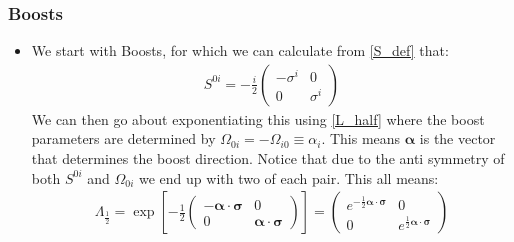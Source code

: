 \documentclass[11pt]{article}
\numberwithin{equation}{section}
\begin{document}
  \subsubsection{Boosts}
  \begin{itemize}
     \item We start with Boosts, for which we can calculate from \ref{S_def} that:
     \begin{align}
     \label{S_ij}
       S^{0i} = -\frac{i}{2}\begin{pmatrix}
        -\sigma^{i} & 0 \\
        0 & \sigma^{i} 
       \end{pmatrix}
     \end{align}
     We can then go about exponentiating this using \ref{L_half} where the boost parameters are determined by $\Omega_{0i} = -\Omega_{i0} \equiv \alpha_{i} $. This means $\boldsymbol{\alpha}$ is the vector that determines the boost direction. Notice that due to the anti symmetry of both $S^{0i}$ and $\Omega_{0i}$ we end up with two of each pair. This all means:
    \begin{align}
    \label{L_boost}
      \Lambda_{\frac{1}{2}} = \exp \left[ -\frac{1}{2}\begin{pmatrix}
        -\boldsymbol{\alpha}\cdot \boldsymbol{\sigma} & 0 \\
        0 & \boldsymbol{\alpha} \cdot \boldsymbol{\sigma}
      \end{pmatrix}\right] = \begin{pmatrix}
        e^{-\frac{1}{2}\boldsymbol{\alpha}\cdot \boldsymbol{\sigma}} & 0 \\
        0 & e^{\frac{1}{2}\boldsymbol{\alpha}\cdot \boldsymbol{\sigma}}
      \end{pmatrix}
    \end{align}
   \end{itemize} 
\end{document}
